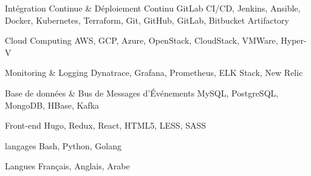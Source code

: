 

\begin{cvskills}

  \cvskill
    {Intégration Continue \& Déploiement Continu} %
    {GitLab CI/CD, Jenkins, Ansible, Docker, Kubernetes, Terraform, Git, GitHub, GitLab, Bitbucket}
    {Artifactory} %


  \cvskill
    {Cloud Computing} %
    {AWS, GCP, Azure, OpenStack, CloudStack, VMWare, Hyper-V} %

  \cvskill
    {Monitoring \& Logging} %
    {Dynatrace, Grafana, Prometheus, ELK Stack, New Relic} %



  \cvskill
    {Base de données \& Bus de Messages d'Événements} %
    {MySQL, PostgreSQL, MongoDB, HBase, Kafka} %

  \cvskill
    {Front-end} %
    {Hugo, Redux, React, HTML5, LESS, SASS} %

  \cvskill
    {langages} %
    {Bash, Python, Golang} %

  \cvskill
    {Langues} %
    {Français, Anglais, Arabe} %

\end{cvskills}
